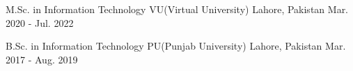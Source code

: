 
\begin{cventries}
  \cventry
    {M.Sc. in Information Technology} %
    {VU(Virtual University)} %
    {Lahore, Pakistan} %
    {Mar. 2020 - Jul. 2022} %
    {}

  \cventry
    {B.Sc. in Information Technology} %
    {PU(Punjab University)} %
    {Lahore, Pakistan} %
    {Mar. 2017 - Aug. 2019} %
    {}



\end{cventries}
